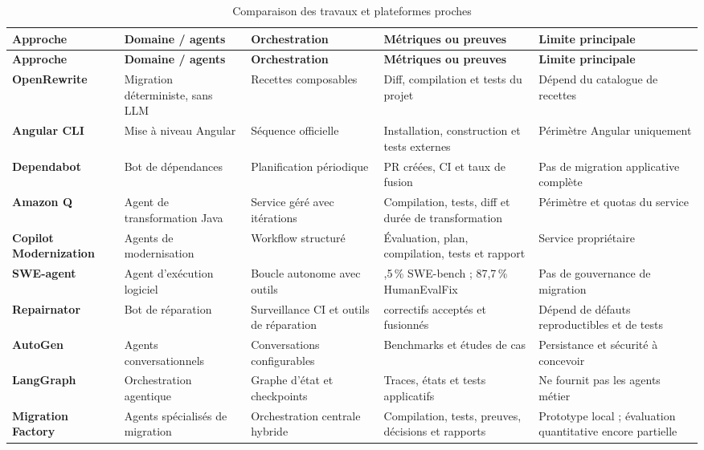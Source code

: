 \scriptsize
\begin{longtable}{|>{\bfseries\RaggedRight\arraybackslash}p{2.2cm}|>{\RaggedRight\arraybackslash}p{2.4cm}|>{\RaggedRight\arraybackslash}p{2.9cm}|>{\RaggedRight\arraybackslash}p{3.2cm}|>{\RaggedRight\arraybackslash}p{4.1cm}|}
    \caption{Comparaison des travaux et plateformes proches}\label{tab:travaux-proches-ch2}\\
    \hline
    \rowcolor{cgilight!95}
    \textbf{Approche} & \textbf{Domaine / agents} & \textbf{Orchestration} & \textbf{Métriques ou preuves} & \textbf{Limite principale} \\
    \hline
    \endfirsthead
    \hline
    \rowcolor{cgilight!95}
    \textbf{Approche} & \textbf{Domaine / agents} & \textbf{Orchestration} & \textbf{Métriques ou preuves} & \textbf{Limite principale} \\
    \hline
    \endhead
    OpenRewrite & Migration déterministe, sans LLM & Recettes composables & Diff, compilation et tests du projet & Dépend du catalogue de recettes \\
    \hline
    Angular CLI & Mise à niveau Angular & Séquence officielle & Installation, construction et tests externes & Périmètre Angular uniquement \\
    \hline
    Dependabot & Bot de dépendances & Planification périodique & PR créées, CI et taux de fusion & Pas de migration applicative complète \\
    \hline
    Amazon Q & Agent de transformation Java & Service géré avec itérations & Compilation, tests, diff et durée de transformation & Périmètre et quotas du service \\
    \hline
    Copilot Modernization & Agents de modernisation & Workflow structuré & Évaluation, plan, compilation, tests et rapport & Service propriétaire \\
    \hline
    SWE-agent & Agent d'exécution logiciel & Boucle autonome avec outils & 12,5\,\% SWE-bench ; 87,7\,\% HumanEvalFix & Pas de gouvernance de migration \\
    \hline
    Repairnator & Bot de réparation & Surveillance CI et outils de réparation & 5 correctifs acceptés et fusionnés & Dépend de défauts reproductibles et de tests \\
    \hline
    AutoGen & Agents conversationnels & Conversations configurables & Benchmarks et études de cas & Persistance et sécurité à concevoir \\
    \hline
    LangGraph & Orchestration agentique & Graphe d'état et checkpoints & Traces, états et tests applicatifs & Ne fournit pas les agents métier \\
    \hline
    Migration Factory & Agents spécialisés de migration & Orchestration centrale hybride & Compilation, tests, preuves, décisions et rapports & Prototype local ; évaluation quantitative encore partielle \\
    \hline
\end{longtable}
\normalsize


